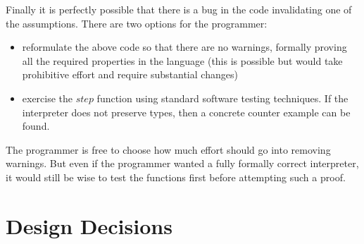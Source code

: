 Finally it is perfectly possible that there is a bug in the code invalidating one of the assumptions.
There are two options for the programmer:
\begin{itemize}
\item reformulate the above code so that there are no warnings, formally proving all the required properties in the language (this is possible but would take prohibitive effort and require substantial changes)
\item exercise the $step$ function using standard software testing techniques.
If the interpreter does not preserve types, then a concrete counter example can be found.
\end{itemize}
The programmer is free to choose how much effort should go into removing warnings.
But even if the programmer wanted a fully formally correct interpreter, it would still be wise to test the functions first before attempting such a proof.



\section{Design Decisions}

